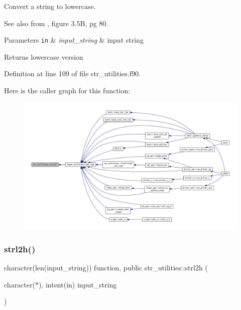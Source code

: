 Convert a string to lowercase. 

\begin{DoxySeeAlso}{See also}
from \cite{RedwineF90}, figure 3.\+5B, pg 80.
\end{DoxySeeAlso}

\begin{DoxyParams}[1]{Parameters}
\mbox{\tt in}  & {\em input\+\_\+string} & input string\\
\hline
\end{DoxyParams}
\begin{DoxyReturn}{Returns}
lowercase version 
\end{DoxyReturn}


Definition at line 109 of file str\+\_\+utilities.\+f90.

Here is the caller graph for this function\+:\nopagebreak
\begin{figure}[H]
\begin{center}
\leavevmode
\includegraphics[width=350pt]{namespacestr__utilities_a219964a283968cc6a968db0197d2187e_icgraph}
\end{center}
\end{figure}
\mbox{\label{namespacestr__utilities_a7e2e441d509c12045a3373819040a806}} 
\subsubsection{\texorpdfstring{strl2h()}{strl2h()}}
{\footnotesize\ttfamily character(len(input\+\_\+string)) function, public str\+\_\+utilities\+::strl2h (\begin{DoxyParamCaption}\item[{character($\ast$), intent(in)}]{input\+\_\+string }\end{DoxyParamCaption})}



